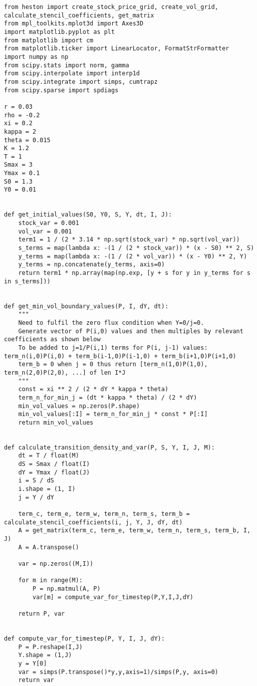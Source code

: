 \documentclass{article}
\begin{document}
\begin{lstlisting}
from heston import create_stock_price_grid, create_vol_grid, calculate_stencil_coefficients, get_matrix
from mpl_toolkits.mplot3d import Axes3D
import matplotlib.pyplot as plt
from matplotlib import cm
from matplotlib.ticker import LinearLocator, FormatStrFormatter
import numpy as np
from scipy.stats import norm, gamma
from scipy.interpolate import interp1d
from scipy.integrate import simps, cumtrapz
from scipy.sparse import spdiags

r = 0.03
rho = -0.2
xi = 0.2
kappa = 2
theta = 0.015
K = 1.2
T = 1
Smax = 3
Ymax = 0.1
S0 = 1.3
Y0 = 0.01


def get_initial_values(S0, Y0, S, Y, dt, I, J):
    stock_var = 0.001
    vol_var = 0.001
    term1 = 1 / (2 * 3.14 * np.sqrt(stock_var) * np.sqrt(vol_var))
    s_terms = map(lambda x: -(1 / (2 * stock_var)) * (x - S0) ** 2, S)
    y_terms = map(lambda x: -(1 / (2 * vol_var)) * (x - Y0) ** 2, Y)
    y_terms = np.concatenate(y_terms, axis=0)
    return term1 * np.array(map(np.exp, [y + s for y in y_terms for s in s_terms]))


def get_min_vol_boundary_values(P, I, dY, dt):
    """
    Need to fulfil the zero flux condition when Y=0/j=0.
    Generate vector of P(i,0) values and then multiples by relevant coefficients as shown below
    To be added to j=1/P(i,1) terms for P(i, j-1) values: term_n(i,0)P(i,0) + term_b(i-1,0)P(i-1,0) + term_b(i+1,0)P(i+1,0)
    term_b = 0 when j = 0 thus return [term_n(1,0)P(1,0), term_n(2,0)P(2,0), ...] of len I*J
    """
    const = xi ** 2 / (2 * dY * kappa * theta)
    term_n_for_min_j = (dt * kappa * theta) / (2 * dY)
    min_vol_values = np.zeros(P.shape)
    min_vol_values[:I] = term_n_for_min_j * const * P[:I]
    return min_vol_values


def calculate_transition_density_and_var(P, S, Y, I, J, M):
    dt = T / float(M)
    dS = Smax / float(I)
    dY = Ymax / float(J)
    i = S / dS
    i.shape = (1, I)
    j = Y / dY

    term_c, term_e, term_w, term_n, term_s, term_b = calculate_stencil_coefficients(i, j, Y, J, dY, dt)
    A = get_matrix(term_c, term_e, term_w, term_n, term_s, term_b, I, J)
    A = A.transpose()

    var = np.zeros((M,I))

    for m in range(M):
        P = np.matmul(A, P)
        var[m] = compute_var_for_timestep(P,Y,I,J,dY)

    return P, var


def compute_var_for_timestep(P, Y, I, J, dY):
    P = P.reshape(I,J)
    Y.shape = (1,J)
    y = Y[0]
    var = simps(P.transpose()*y,y,axis=1)/simps(P,y, axis=0)
    return var



\end{lstlisting}
\end{document}
